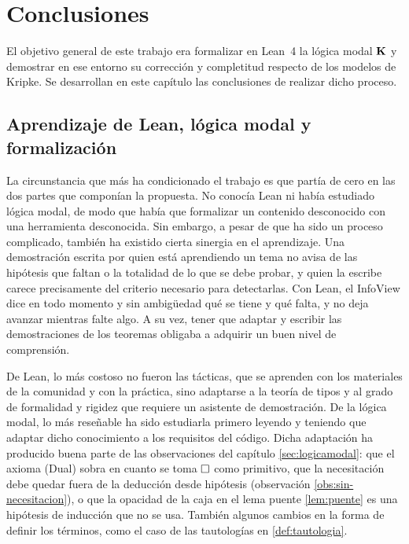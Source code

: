 \chapter{Conclusiones}\label{sec:conclusiones}

El objetivo general de este trabajo era formalizar en Lean~4 la lógica modal $\mathbf{K}$ y demostrar en ese entorno su corrección y completitud respecto de los modelos de Kripke. Se desarrollan en este capítulo las conclusiones de realizar dicho proceso.

\section{Aprendizaje de Lean, lógica modal y formalización}\label{sec:aprendizaje}

La circunstancia que más ha condicionado el trabajo es que partía de cero en las dos partes que componían la propuesta. No conocía Lean ni había estudiado lógica modal, de modo que había que formalizar un contenido desconocido con una herramienta desconocida. Sin embargo, a pesar de que ha sido un proceso complicado, también ha existido cierta sinergia en el aprendizaje. Una demostración escrita por quien está aprendiendo un tema no avisa de las hipótesis que faltan o la totalidad de lo que se debe probar, y quien la escribe carece precisamente del criterio necesario para detectarlas. Con Lean, el InfoView dice en todo momento y sin ambigüedad qué se tiene y qué falta, y no deja avanzar mientras falte algo. A su vez, tener que adaptar y escribir las demostraciones de los teoremas obligaba a adquirir un buen nivel de comprensión.

De Lean, lo más costoso no fueron las tácticas, que se aprenden con los materiales de la comunidad \cite{tpil, mil, nng} y con la práctica, sino adaptarse a la teoría de tipos y al grado de formalidad y rigidez que requiere un asistente de demostración. De la lógica modal, lo más reseñable ha sido estudiarla primero leyendo \cite{blackburn} y teniendo que adaptar dicho conocimiento a los requisitos del código. Dicha adaptación ha producido buena parte de las observaciones del capítulo \ref{sec:logicamodal}: que el axioma (Dual) sobra en cuanto se toma $\square$ como primitivo, que la necesitación debe quedar fuera de la deducción desde hipótesis (observación \ref{obs:sin-necesitacion}), o que la opacidad de la caja en el lema puente \ref{lem:puente} es una hipótesis de inducción que no se usa. También algunos cambios en la forma de definir los términos, como el caso de las tautologías en \ref{def:tautologia}.

